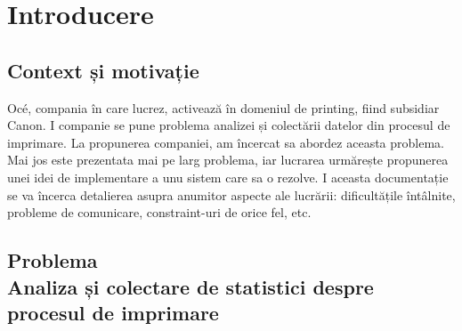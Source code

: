 \documentclass[a4paper, 12pt, twoside]{report}
\begin{document}
\newpage\null\thispagestyle{empty}\newpage

\tableofcontents

\newpage\null\thispagestyle{empty}\newpage

\chapter{Introducere}

	\section{Context și motivație}
Océ, compania în care lucrez, activează în domeniul de printing, fiind subsidiar Canon. I companie se pune problema analizei și colectării datelor din procesul de imprimare. La propunerea companiei, am încercat sa abordez aceasta problema. Mai jos este prezentata mai pe larg problema, iar lucrarea urmărește propunerea unei idei de implementare a unu sistem care sa o rezolve. I aceasta documentație se va încerca detalierea asupra anumitor aspecte ale lucrării: dificultățile întâlnite, probleme de comunicare, constraint-uri de orice fel, etc.

	\section[Problema]{Problema \\ {\large Analiza și colectare de statistici despre procesul de imprimare}}
\end{document}
